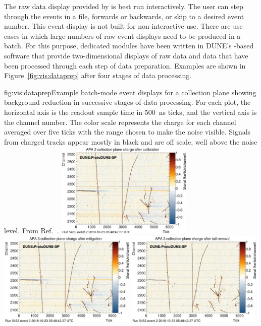 \documentclass[../main-v1.tex]{subfiles}
\begin{document}
The raw data display provided by  is best run interactively.  The user can step through the events in a file, forwards or backwards, or skip to a desired event number.  This event display is not built for non-interactive use.  There are use cases in which large numbers of raw event displays need to be produced in a batch.  For this purpose, dedicated modules have been written in DUNE's -based software that provide two-dimensional displays of raw data and data that have been processed through each step of data preparation. Examples are shown in Figure~\ref{fig:vis:dataprep} after four stages of data processing.


\begin{dunefigure}{fig:vis:dataprep}{Example batch-mode event displays for a collection plane showing background reduction in successive stages of data processing.
For each plot, the horizontal axis is the readout sample time in 500~ns ticks, and the vertical axis is the channel number.
The color scale represents the charge for each channel averaged over five ticks
with the range chosen to make the noise visible.
Signals from charged tracks appear mostly in black and are off scale, well
above the noise level.  From Ref.~\cite{DUNE:2020cqd}.}
\includegraphics[width=0.49\textwidth]{graphics/EventDisplays/adccal_tpp0z_run005452_evt000002.png}
\includegraphics[width=0.49\textwidth]{graphics/EventDisplays/adcmit_tpp0z_run005452_evt000002.png}
\includegraphics[width=0.49\textwidth]{graphics/EventDisplays/adctai_tpp0z_run005452_evt000002.png}

\end{dunefigure}
\end{document}
